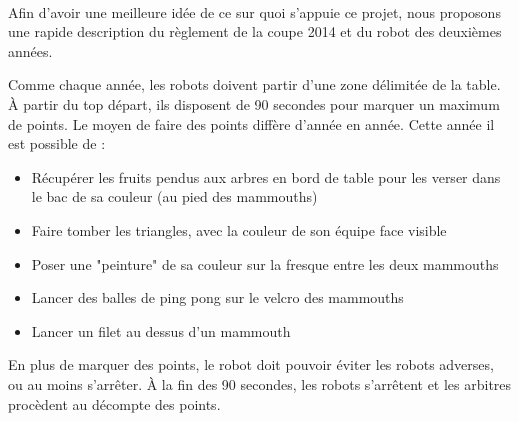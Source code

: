 \paragraph{}
Afin d'avoir une meilleure idée de ce sur quoi s'appuie ce projet, nous proposons une rapide description du règlement de la coupe 2014 et du robot des deuxièmes années.

Comme chaque année, les robots doivent partir d'une zone délimitée de la table. À partir du top départ, ils disposent de 90 secondes pour marquer un maximum de points. Le moyen de faire des points diffère d'année en année. Cette année il est possible de :
\begin{itemize}
\item Récupérer les fruits pendus aux arbres en bord de table pour les verser dans le bac de sa couleur (au pied des mammouths)
\item Faire tomber les triangles, avec la couleur de son équipe face visible
\item Poser une "peinture" de sa couleur sur la fresque entre les deux mammouths
\item Lancer des balles de ping pong sur le velcro des mammouths
\item Lancer un filet au dessus d'un mammouth
\end{itemize}
En plus de marquer des points, le robot doit pouvoir éviter les robots adverses, ou au moins s'arrêter. À la fin des 90 secondes, les robots s'arrêtent et les arbitres procèdent au décompte des points.

